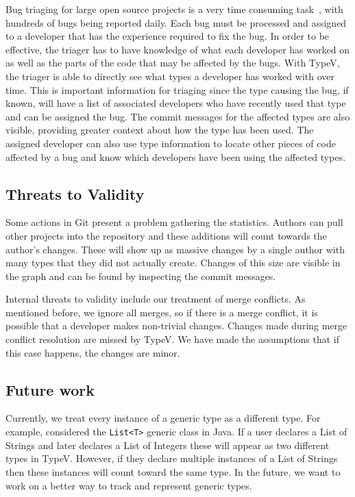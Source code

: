 Bug triaging for large open source projects is a very time consuming task~\cite{badashian2015}, with hundreds  of bugs being reported daily. Each bug must be processed and assigned to a developer that has the experience required to fix the bug. In order to be effective, the triager has to have knowledge of what each developer has worked on as well as the parts of the code that may be affected by the bugs. With TypeV, the triager is able to directly see what types a developer has worked with over time. This is important information for triaging since the type causing the bug, if known, will have a list of associated developers who have recently used that type and can be assigned the bug. The commit messages for the affected types are also visible, providing greater context about how the type has been used. The assigned developer can also use type information to locate other pieces of code affected by a bug and know which developers have been using the affected types.

\subsection{Threats to Validity}

Some actions in Git present a problem gathering the statistics. Authors can pull other projects into the repository and these additions will count towards the author's changes. These will show up as massive changes by a single author with many types that they did not actually create. Changes of this size are visible in the graph and can be found by inspecting the commit messages.

Internal threats to validity include our treatment of merge conflicts. As mentioned before, we ignore all merges, so if there is a merge conflict, it is possible that a developer makes non-trivial changes. Changes made during merge conflict resolution are missed by TypeV. We have made the assumptions that if this case happens, the changes are minor.

\subsection{Future work}

Currently, we treat every instance of a generic type as a different type. For example, considered the \texttt{List<T>} generic class in Java. If a user declares a List of Strings and later declares a List of Integers these will appear as two different types in TypeV. However, if they declare multiple instances of a List of Strings then these instances will count toward the same type. In the future, we want to work on a better way to track and represent generic types.

